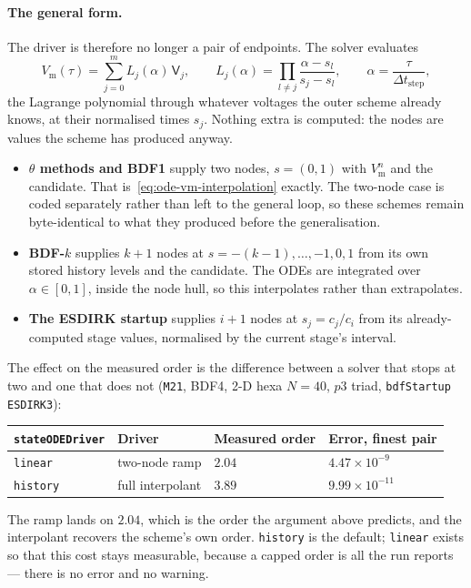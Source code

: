 \documentclass[11pt,a4paper]{article}
\newcommand{\code}[1]{\texttt{\small #1}}
\newcommand{\Vm}{V_{\text{m}}}
\begin{document}
\paragraph{The general form.} The driver is therefore no longer a pair of
endpoints. The solver evaluates
\begin{equation}
  \Vm(\tau) = \sum_{j=0}^{m} L_j(\alpha)\,\mathsf{V}_{j},
  \qquad
  L_j(\alpha)=\prod_{l\ne j}\frac{\alpha-s_l}{s_j-s_l},
  \qquad
  \alpha=\frac{\tau}{\Delta t_{\text{step}}},
  \label{eq:ode-vm-lagrange}
\end{equation}
the Lagrange polynomial through whatever voltages the outer scheme already
knows, at their normalised times $s_j$. Nothing extra is computed: the nodes are
values the scheme has produced anyway.
\begin{itemize}
  \item \textbf{$\theta$ methods and BDF1} supply two nodes, $s=(0,1)$ with
        $\Vm^n$ and the candidate. That is~\eqref{eq:ode-vm-interpolation}
        exactly. The two-node case is coded separately rather than left to the
        general loop, so these schemes remain byte-identical to what they
        produced before the generalisation.
  \item \textbf{BDF-$k$} supplies $k+1$ nodes at $s=-(k-1),\dots,-1,0,1$ from
        its own stored history levels and the candidate. The ODEs are integrated
        over $\alpha\in[0,1]$, inside the node hull, so this interpolates rather
        than extrapolates.
  \item \textbf{The ESDIRK startup} supplies $i+1$ nodes at $s_j=c_j/c_i$ from
        its already-computed stage values, normalised by the current stage's
        interval.
\end{itemize}

The effect on the measured order is the difference between a solver that stops
at two and one that does not (\code{M21}, BDF4, 2-D hexa $N=40$, $p3$ triad,
\code{bdfStartup ESDIRK3}):
\begin{center}
\begin{tabular}{@{}llll@{}}
\toprule
\code{stateODEDriver} & Driver & Measured order & Error, finest pair \\
\midrule
\code{linear}  & two-node ramp     & $2.04$ & $4.47\times10^{-9}$ \\
\code{history} & full interpolant  & $\mathbf{3.89}$ & $9.99\times10^{-11}$ \\
\bottomrule
\end{tabular}
\end{center}
The ramp lands on $2.04$, which is the order the argument above predicts, and
the interpolant recovers the scheme's own order. \code{history} is the default;
\code{linear} exists so that this cost stays measurable, because a capped order
is all the run reports --- there is no error and no warning.
\end{document}
